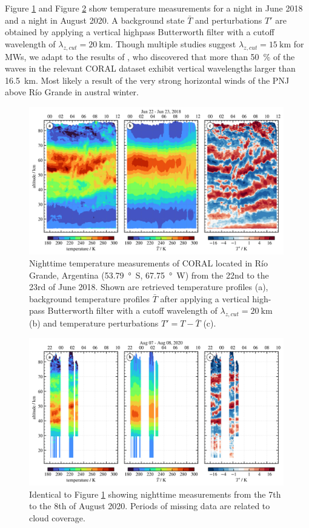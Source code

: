 Figure \ref{fig:coral_2018} and Figure \ref{fig:coral_2020} show temperature measurements for a night in June 2018 and a night in August 2020. A background state $\bar{T}$ and perturbations $T'$ are obtained by applying a vertical highpass Butterworth filter with a cutoff wavelength of $\lambda_{z,cut}=\SI{20}{\kilo\meter}$. Though multiple studies suggest $\lambda_{z,cut}=\SI{15}{\kilo\meter}$ for MWs, we adapt to the results of \textcite[]{reichert_robert_characterization_2022}, who discovered that more than \SI{50}{\percent} of the waves in the relevant CORAL dataset exhibit vertical wavelengths larger than \SI{16.5}{\kilo\meter}. Most likely a result of the very strong horizontal winds of the PNJ above Río Grande in austral winter.
\begin{figure}[tbp]
    \centering
    \includegraphics[width=0.99\textwidth]{figures_lidar/coral_event_20180622.png}
    \caption{Nighttime temperature measurements of CORAL located in Río Grande, Argentina (\SI{53.79}{\degree S}, \SI{67.75}{\degree W}) from the 22nd to the 23rd of June 2018. Shown are retrieved temperature profiles (a), background temperature profiles $\bar{T}$ after applying a vertical high-pass Butterworth filter with a cutoff wavelength of $\lambda_{z,cut}=\SI{20}{\kilo\meter}$ (b) and temperature perturbations $T'=T-\bar{T}$ (c).}
    \label{fig:coral_2018}
\end{figure}
\begin{figure}[tbp]
    \centering
    \includegraphics[width=0.99\textwidth]{figures_lidar/coral_event_20200807.png}
    \caption{Identical to Figure \ref{fig:coral_2018} showing nighttime measurements from the 7th to the 8th of August 2020. Periods of missing data are related to cloud coverage.}
    \label{fig:coral_2020}
\end{figure}
